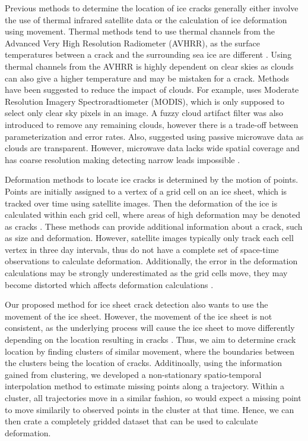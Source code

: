 \documentclass[12pt]{article}
\begin{document}
Previous methods to determine the location of ice cracks generally
either involve the use of thermal infrared satellite data or the
calculation of ice deformation using movement. Thermal methods tend to
use thermal channels from the Advanced Very High Resolution Radiometer
(AVHRR), as the surface temperatures between a crack and the surrounding
sea ice are different \citep{key_detectability_1993}. Using thermal
channels from the AVHRR is highly dependent on clear skies as clouds can
also give a higher temperature and may be mistaken for a crack. Methods
have been suggested to reduce the impact of clouds. For example,
\citet{willmes_pan-arctic_2015} uses Moderate Resolution Imagery
Spectroradtiometer (MODIS), which is only supposed to select only clear
sky pixels in an image. A fuzzy cloud artifact filter was also
introduced to remove any remaining clouds, however there is a trade-off
between parameterization and error rates. Also,
\citet{rohrs_algorithm_2012} suggested using passive microwave data as
clouds are transparent. However, microwave data lacks wide spatial
coverage and has coarse resolution making detecting narrow leads
impossible \citep{hoffman_detection_2019}.

Deformation methods to locate ice cracks is determined by the motion of
points. Points are initially assigned to a vertex of a grid cell on an
ice sheet, which is tracked over time using satellite images. Then the
deformation of the ice is calculated within each grid cell, where areas
of high deformation may be denoted as cracks
\citep{peterson_evaluating_2011}. These methods can provide additional
information about a crack, such as size and deformation. However,
satellite images typically only track each cell vertex in three day
intervals, thus do not have a complete set of space-time observations to
calculate deformation. Additionally, the error in the deformation
calculations may be strongly underestimated as the grid cells move, they
may become distorted which affects deformation calculations
\citep{bouillon_producing_2015}.

Our proposed method for ice sheet crack detection also wants to use the
movement of the ice sheet. However, the movement of the ice sheet is not
consistent, as the underlying process will cause the ice sheet to move
differently depending on the location resulting in cracks
\citep{peterson_evaluating_2011}. Thus, we aim to determine crack
location by finding clusters of similar movement, where the boundaries
between the clusters being the location of cracks. Additinoally, using
the information gained from clustering, we developed a non-stationary
spatio-temporal interpolation method to estimate missing points along a
trajectory. Within a cluster, all trajectories move in a similar
fashion, so would expect a missing point to move similarily to observed
points in the cluster at that time. Hence, we can then crate a
completely gridded dataset that can be used to calculate deformation.
\end{document}
